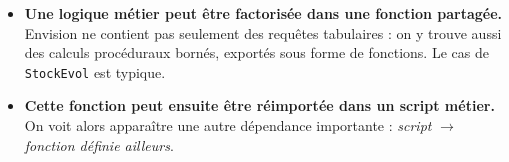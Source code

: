 \vspace{0.5cm}

\begin{itemize}
    \item \textbf{Une logique métier peut être factorisée dans une fonction partagée.} Envision ne contient pas seulement des requêtes tabulaires : on y trouve aussi des calculs procéduraux bornés, exportés sous forme de fonctions. Le cas de \texttt{StockEvol} est typique.
\end{itemize}

\vspace{0.5cm}


\vspace{0.5cm}

\begin{itemize}
    \item \textbf{Cette fonction peut ensuite être réimportée dans un script métier.} On voit alors apparaître une autre dépendance importante : \emph{script} $\rightarrow$ \emph{fonction définie ailleurs}.
\end{itemize}

\vspace{0.5cm}

